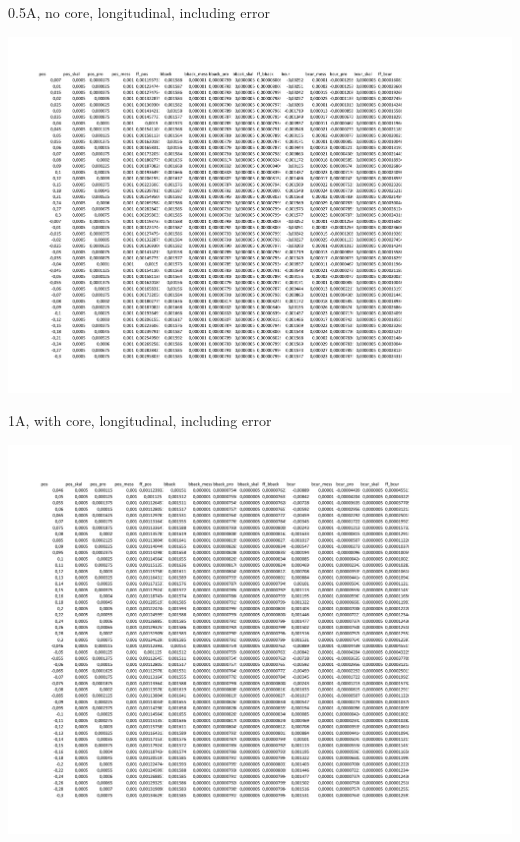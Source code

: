 \documentclass[12pt]{article}
\begin{document}
	\begin{table}[H]
		\caption{0.5A, no core, longitudinal, including error}
		\includegraphics[width=20cm]{Daten.xlsx - 0,5A ohne Kern longitudinal.pdf}		
	\end{table}

	\begin{table}[H]
		\caption{1A, with core, longitudinal, including error}
		\includegraphics[width=20cm]{Daten.xlsx - 1A mit Kern longitudinal.pdf}		
	\end{table}
\end{document}
